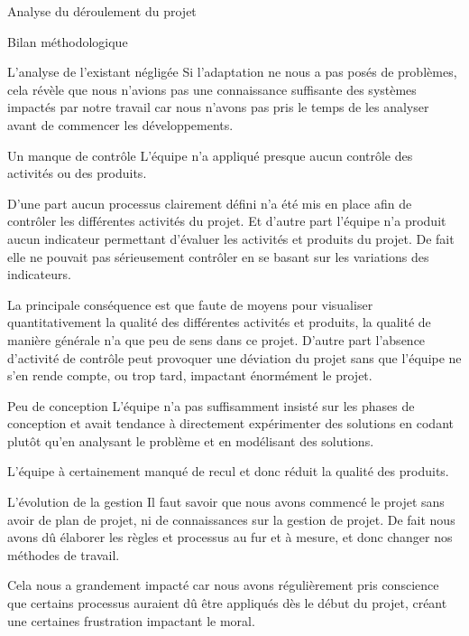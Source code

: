 \documentclass[]{article}
\begin{document}
{\begin{section}{Analyse du déroulement du projet}
\begin{subsection}{Bilan méthodologique}
\begin{subsubsection}{L'analyse de l'existant négligée}
         Si l'adaptation ne nous a pas posés de problèmes, cela révèle que nous n'avions pas une connaissance suffisante des systèmes impactés par notre travail car nous n'avons pas pris le temps de les analyser avant de commencer les développements.
     \end{subsubsection}

     \begin{subsubsection}{Un manque de contrôle}
         L'équipe n'a appliqué presque aucun contrôle des activités ou des produits.

         D'une part aucun processus clairement défini n'a été mis en place afin de contrôler les différentes activités du projet. Et d'autre part l'équipe n'a produit aucun indicateur permettant d'évaluer les activités et produits du projet. De fait elle ne pouvait pas sérieusement contrôler en se basant sur les variations des indicateurs.

         La principale conséquence est que faute de moyens pour visualiser quantitativement la qualité des différentes activités et produits, la qualité de manière générale n'a que peu de sens dans ce projet. D'autre part l'absence d'activité de contrôle peut provoquer une déviation du projet sans que l'équipe ne s'en rende compte, ou trop tard, impactant énormément le projet.
     \end{subsubsection}

     \begin{subsubsection}{Peu de conception}
         L'équipe n'a pas suffisamment insisté sur les phases de conception et avait tendance à directement expérimenter des solutions en codant plutôt qu'en analysant le problème et en modélisant des solutions.

         L'équipe à certainement manqué de recul et donc réduit la qualité des produits.
     \end{subsubsection}

     \begin{subsubsection}{L'évolution de la gestion}
         Il faut savoir que nous avons commencé le projet sans avoir de plan de projet, ni de connaissances sur la gestion de projet. De fait nous avons dû élaborer les règles et processus au fur et à mesure, et donc changer nos méthodes de travail.

         Cela nous a grandement impacté car nous avons régulièrement pris conscience que certains processus auraient dû être appliqués dès le début du projet, créant une certaines frustration impactant le moral.
     \end{subsubsection}


\end{subsection}
\end{section}}
\end{document}
